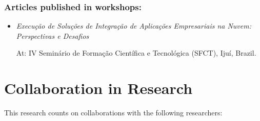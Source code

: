 \subsubsection*{Articles published in workshops:}

\begin{itemize}
\item \textit{Execução de Soluções de Integração de Aplicações Empresariais na Nuvem: Perspectivas e Desafios}

At: IV Seminário de Formação Científica e Tecnológica (SFCT), Ijuí, Brazil.
\end{itemize}

\section{Collaboration in Research}  
\label{sec:collaboration}  
\noindent

This research counts on collaborations with the following researchers:

